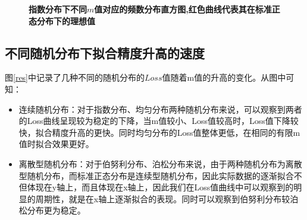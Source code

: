 \documentclass{article}
\begin{document}
\begin{figure}[h]
    \caption{\textbf{指数分布下不同$m$值对应的频数分布直方图,红色曲线代表其在标准正态分布下的理想值}}
    \label{exp}
    \end{figure}
\subsection{不同随机分布下拟合精度升高的速度}
图\ref{res}中记录了几种不同的随机分布的$Loss$值随着m值的升高的变化。从图中可知：
\begin{itemize}
    \item 连续随机分布：对于指数分布、均匀分布两种随机分布来说，可以观察到两者的Loss曲线呈现较为稳定的下降，当m值较小、Loss值较高时，Loss值下降较快，拟合精度升高的更快。同时均匀分布的Loss值整体更低，在相同的有限m值时拟合效果更好。
    \item 离散型随机分布：对于伯努利分布、泊松分布来说，由于两种随机分布为离散型随机分布，而标准正态分布是连续型随机分布，因此实际数据的逐渐拟合不但体现在y轴上，而且体现在x轴上，因此我们在Loss值曲线中可以观察到的明显的周期性，就是在x轴上逐渐拟合的表现。同时可以观察到伯努利分布较泊松分布更为稳定。
\end{itemize}
\end{document}

